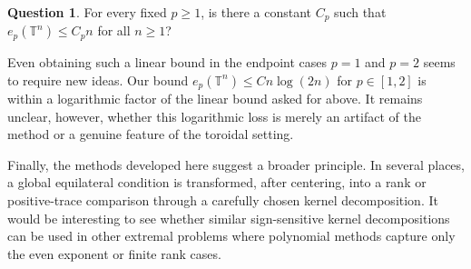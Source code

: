 \documentclass[11pt]{article}
\theoremstyle{definition}
\newtheorem{ques}[theorem]{Question}
\begin{document}
\begin{ques}
For every fixed \(p\ge 1\), is there a constant \(C_p\) such that
\(
e_p(\mathbb T^n)\le C_p n
\)
for all \(n\ge1\)?
\end{ques}

Even obtaining such a linear bound in the endpoint cases \(p=1\) and \(p=2\)
seems to require new ideas.  Our bound
\(
e_p(\mathbb T^n)\le C n\log(2n)
\)
for \(p\in[1,2]\) is within a logarithmic factor of the linear bound asked for
above.  It remains unclear, however, whether this logarithmic loss is merely an
artifact of the method or a genuine feature of the toroidal setting.

Finally, the methods developed here suggest a broader principle. In several
places, a global equilateral condition is transformed, after centering, into a
rank or positive-trace comparison through a carefully chosen kernel
decomposition. It would be interesting to see whether similar sign-sensitive
kernel decompositions can be used in other extremal problems where polynomial
methods capture only the even exponent or finite rank cases.






\end{document}
